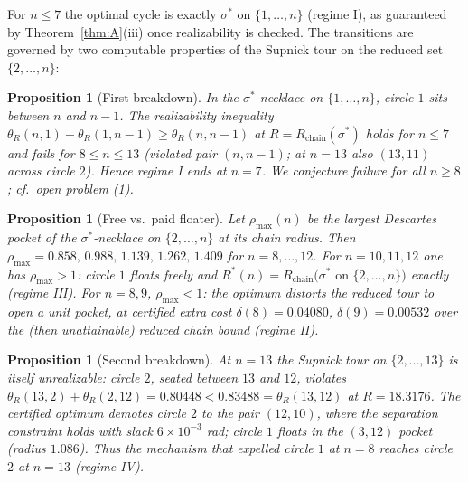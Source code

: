 \documentclass[11pt]{article}
\newtheorem{proposition}[theorem]{Proposition}
\theoremstyle{definition}
\theoremstyle{remark}
\begin{document}
For $n\le7$ the optimal cycle is exactly $\sigma^\ast$ on $\{1,\dots,n\}$ (regime I), as guaranteed by Theorem~\ref{thm:A}(iii) once realizability is checked. The transitions are governed by two computable properties of the Supnick tour on the reduced set $\{2,\dots,n\}$:

\begin{proposition}[First breakdown]\label{prop:break1}
In the $\sigma^\ast$-necklace on $\{1,\dots,n\}$, circle $1$ sits between $n$ and $n-1$. The realizability inequality
$\theta_R(n,1)+\theta_R(1,n-1)\ge\theta_R(n,n-1)$ at $R=R_{\mathrm{chain}}(\sigma^\ast)$
holds for $n\le 7$ and fails for $8\le n\le 13$ (violated pair $(n,n-1)$; at $n=13$ also $(13,11)$ across circle $2$). Hence regime I ends at $n=7$. We conjecture failure for all $n\ge8$; cf.\ open problem (1).
\end{proposition}

\begin{proposition}[Free vs.\ paid floater]\label{prop:break2}
Let $\rho_{\max}(n)$ be the largest Descartes pocket of the $\sigma^\ast$-necklace on $\{2,\dots,n\}$ at its chain radius. Then $\rho_{\max}=0.858,\,0.988,\,1.139,\,1.262,\,1.409$ for $n=8,\dots,12$. For $n=10,11,12$ one has $\rho_{\max}>1$: circle $1$ floats freely and
$R^\ast(n)=R_{\mathrm{chain}}\big(\sigma^\ast\text{ on }\{2,\dots,n\}\big)$ exactly (regime III).
For $n=8,9$, $\rho_{\max}<1$: the optimum distorts the reduced tour to open a unit pocket, at certified extra cost $\delta(8)=0.04080$, $\delta(9)=0.00532$ over the (then unattainable) reduced chain bound (regime II).
\end{proposition}

\begin{proposition}[Second breakdown]\label{prop:break3}
At $n=13$ the Supnick tour on $\{2,\dots,13\}$ is itself unrealizable: circle $2$, seated between $13$ and $12$, violates
$\theta_R(13,2)+\theta_R(2,12)=0.80448<0.83488=\theta_R(13,12)$ at $R=18.3176$.
The certified optimum demotes circle $2$ to the pair $(12,10)$, where the separation constraint holds with slack $6\times10^{-3}$ rad; circle $1$ floats in the $(3,12)$ pocket (radius $1.086$). Thus the mechanism that expelled circle $1$ at $n=8$ reaches circle $2$ at $n=13$ (regime IV).
\end{proposition}
\end{document}
